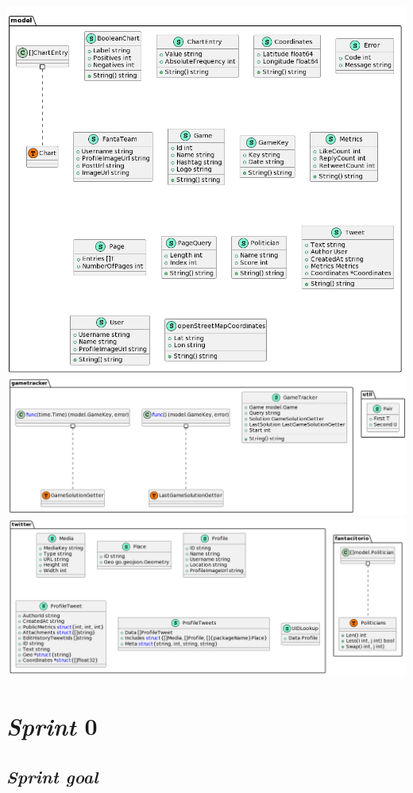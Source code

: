 \documentclass{article}
\begin{document}
\includegraphics[width=\textwidth]{backend-model}
\includegraphics[width=\textwidth]{backend-gametracker-util}
\includegraphics[width=\textwidth]{backend-twitter-fantacitorio}

\section{\emph{Sprint} 0}

\subsection{\emph{Sprint goal}}
\end{document}
